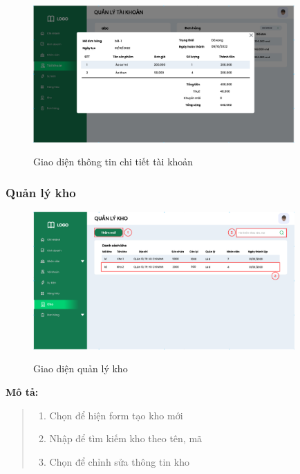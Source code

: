             \begin{figure}[!htp]
                \centering
                \includegraphics[width=10cm]{img/UI/admin/account_order.png}
                \label{31}
                \newline
                \caption{Giao diện thông tin chi tiết tài khoản}
            \end{figure}
    \subsubsection{Quản lý kho}
        \begin{figure}[!htp]
            \centering
            \includegraphics[width=10cm]{img/UI/admin/warehouse.png}
            \label{32}
            \newline
            \caption{Giao diện quản lý kho}
        \end{figure}
        \textbf{Mô tả:}  
        \begin{quote}
            \begin{enumerate}
                \item Chọn để hiện form tạo kho mới
                \item Nhập để tìm kiếm kho theo tên, mã
                \item Chọn để chỉnh sửa thông tin kho
            \end{enumerate}
        \end{quote}
